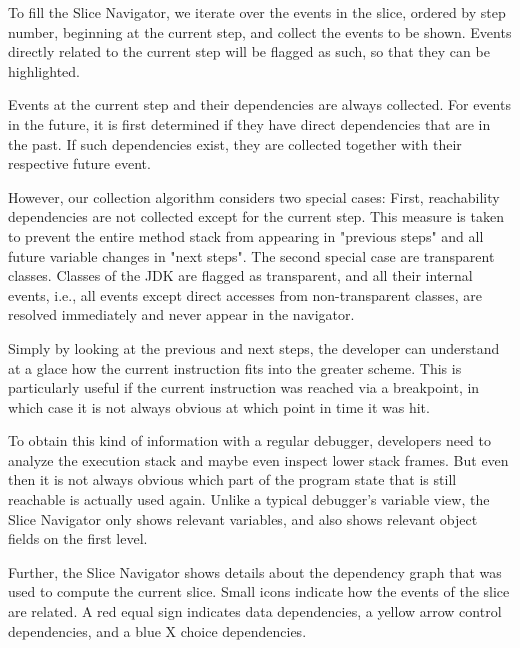 
To fill the Slice Navigator, we iterate over the events in the slice, ordered by step number, beginning at the current step, and collect the events to be shown.
Events directly related to the current step will be flagged as such, so that they can be highlighted.

Events at the current step and their dependencies are always collected.
For events in the future, it is first determined if they have direct dependencies that are in the past.
If such dependencies exist, they are collected together with their respective future event.

However, our collection algorithm considers two special cases:
First, reachability dependencies are not collected except for the current step.
This measure is taken to prevent the entire method stack from appearing in "previous steps" and all future variable changes in "next steps".
The second special case are transparent classes.
Classes of the JDK are flagged as transparent, and all their internal events, i.e., all events except direct accesses from non-transparent classes, are resolved immediately and never appear in the navigator.

Simply by looking at the previous and next steps, the developer can understand at a glace how the current instruction fits into the greater scheme.
This is particularly useful if the current instruction was reached via a breakpoint, in which case it is not always obvious at which point in time it was hit.

To obtain this kind of information with a regular debugger, developers need to analyze the execution stack and maybe even inspect lower stack frames.
But even then it is not always obvious which part of the program state that is still reachable is actually used again.
Unlike a typical debugger's variable view, the Slice Navigator only shows relevant variables, and also shows relevant object fields on the first level.

Further, the Slice Navigator shows details about the dependency graph that was used to compute the current slice.
Small icons indicate how the events of the slice are related.
A red equal sign indicates data dependencies, a yellow arrow control dependencies, and a blue X choice dependencies.

